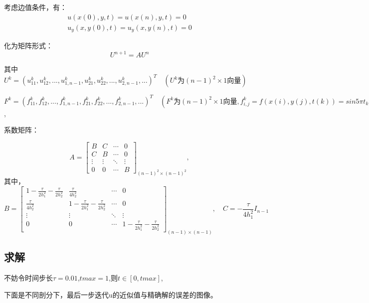 \documentclass[12pt,a4paper]{article}
\begin{document}
考虑边值条件，有：
\begin{equation}
\begin{array}{l}{u(x(0),y,t) = u(x(n),y,t)=0}\\
{u_y(x,y(0),t) = u_y(x,y(n),t)=0}\end{array}
\end{equation}


化为矩阵形式：
$$U^{n+1} = A U^{n}$$

其中$U^k = (u^k_{11},u^k_{12},...,u^k_{1,n-1},u^k_{21},u^k_{22},...,u^k_{2,n-1},...)^{T} \quad (U^k\text{为}(n-1)^2 \times 1 \text{向量})$

$F^k = (f^k_{11},f^k_{12},...,f^k_{1,n-1},f^k_{21},f^k_{22},...,f^k_{2,n-1},...)^{T} \quad (F^k\text{为}(n-1)^2 \times 1\text{向量},f^k_{i,j}=f(x(i),y(j),t(k)) = sin{5 \pi t_k}sin{2 \pi x_i}sin{\pi y_j})$,

系数矩阵：

\begin{equation}
A = \left[                 
\begin{array}{cccc}
B& C &\cdots  & 0\\
C& B &\cdots& 0\\
\vdots  & \vdots & \ddots & \vdots \\
0& 0 &\cdots  &B
\end{array}
\right ]_{(n-1)^2 \times (n-1)^2},
\end{equation}
其中，
\begin{equation}
 B = \left[                 
\begin{array}{cccc}
1-\frac{\tau}{2h_1^2}-\frac{\tau}{2h_2^2}& \frac{\tau}{4h_2^2} &\cdots  & 0\\
\frac{\tau}{4h_2^2}& 1-\frac{\tau}{2h_1^2}-\frac{\tau}{2h_2^2} &\cdots& 0\\
\vdots  & \vdots & \ddots & \vdots \\
0& 0 &\cdots  &1-\frac{\tau}{2h_1^2}-\frac{\tau}{2h_2^2}
\end{array}
\right ]_{(n-1) \times (n-1)} ,\quad C = -\frac{\tau}{4h_1^2} I_{n-1}
\end{equation}
\newpage
\subsection{求解}
不妨令时间步长$\tau = 0.01$,$tmax = 1$,则$t \in [0,tmax]$,

下面是不同剖分下，最后一步迭代u的近似值与精确解的误差的图像。
\end{document}
